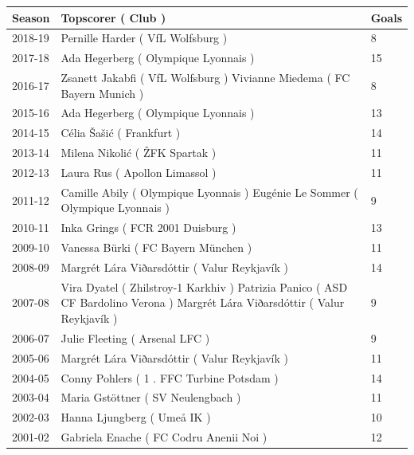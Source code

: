\documentclass{article}
\begin{document}
\begin{tabular}{lll}
\toprule
Season & Topscorer ( Club ) & Goals \\
\midrule
2018-19 & Pernille Harder ( VfL Wolfsburg ) & 8 \\
2017-18 & Ada Hegerberg ( Olympique Lyonnais ) & 15 \\
2016-17 & Zsanett Jakabfi ( VfL Wolfsburg ) Vivianne Miedema ( FC Bayern Munich ) & 8 \\
2015-16 & Ada Hegerberg ( Olympique Lyonnais ) & 13 \\
2014-15 & Célia Šašić ( Frankfurt ) & 14 \\
2013-14 & Milena Nikolić ( ŽFK Spartak ) & 11 \\
2012-13 & Laura Rus ( Apollon Limassol ) & 11 \\
2011-12 & Camille Abily ( Olympique Lyonnais ) Eugénie Le Sommer ( Olympique Lyonnais ) & 9 \\
2010-11 & Inka Grings ( FCR 2001 Duisburg ) & 13 \\
2009-10 & Vanessa Bürki ( FC Bayern München ) & 11 \\
2008-09 & Margrét Lára Viðarsdóttir ( Valur Reykjavík ) & 14 \\
2007-08 & Vira Dyatel ( Zhilstroy-1 Karkhiv ) Patrizia Panico ( ASD CF Bardolino Verona ) Margrét Lára Viðarsdóttir ( Valur Reykjavík ) & 9 \\
2006-07 & Julie Fleeting ( Arsenal LFC ) & 9 \\
2005-06 & Margrét Lára Viðarsdóttir ( Valur Reykjavík ) & 11 \\
2004-05 & Conny Pohlers ( 1 . FFC Turbine Potsdam ) & 14 \\
2003-04 & Maria Gstöttner ( SV Neulengbach ) & 11 \\
2002-03 & Hanna Ljungberg ( Umeå IK ) & 10 \\
2001-02 & Gabriela Enache ( FC Codru Anenii Noi ) & 12 \\
\bottomrule
\end{tabular}
\end{document}
